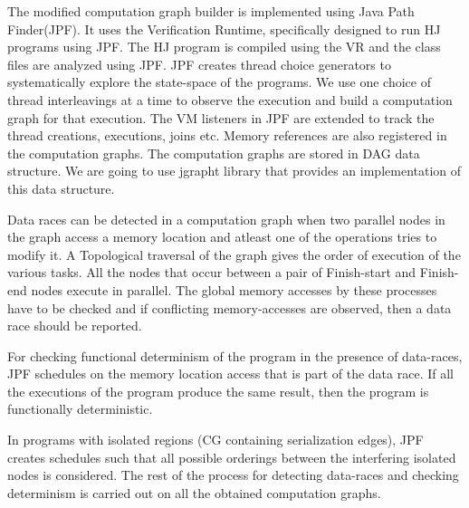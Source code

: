 The modified computation graph builder is implemented using Java Path Finder(JPF). It uses the Verification Runtime, specifically designed to run HJ programs using JPF. The HJ program is compiled using the VR and the class files are analyzed using JPF. JPF creates thread choice generators to systematically explore the state-space of the programs. We use one choice of thread interleavings at a time to observe the execution and build a computation graph for that execution. The VM listeners in JPF are extended to track the thread creations, executions, joins etc. Memory references are also registered in the computation graphs. The computation graphs are stored in DAG data structure. We are going to use jgrapht library that provides an implementation of this data structure.

Data races can be detected in a computation graph when two parallel nodes in the graph access a memory location and atleast one of the operations tries to modify it. A Topological traversal of the graph gives the order of execution of the various tasks. All the nodes that occur between  a pair of Finish-start and Finish-end nodes execute in parallel. The global memory accesses by these processes have to be checked and if conflicting memory-accesses are observed, then a data race should be reported.

For checking functional determinism of the program in the presence of data-races, JPF schedules on the memory location access that is part of the data race. If all the executions of the program produce the same result, then the program is functionally deterministic.

In programs with isolated regions (CG containing serialization edges), JPF creates schedules such that all possible orderings between the interfering isolated nodes is considered. The rest of the process for detecting data-races and checking determinism is carried out on all the obtained computation graphs.
